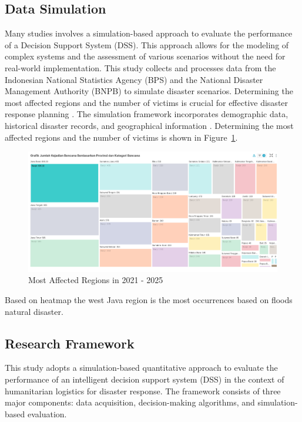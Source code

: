 \documentclass[journal,final,a4paper,twoside,11pt]{IEEEtran}
\begin{document}
\subsection{Data Simulation}

Many studies involves a simulation-based approach to evaluate the performance of a Decision Support System (DSS)\cite{he2020dynamic}. This approach allows for the modeling of complex systems and the assessment of various scenarios without the need for real-world implementation\cite{latchmore2023integrating}. This study collects and processes data from the Indonesian National Statistics Agency (BPS) and the National Disaster Management Authority (BNPB) to simulate disaster scenarios. Determining the most affected regions and the number of victims is crucial for effective disaster response planning \cite{endo2020estimating}. The simulation framework incorporates demographic data, historical disaster records, and geographical information \cite{santos2020workforce}. Determining the most affected regions and the number of victims is shown in Figure~\ref{fig:simulationframework}. 
\begin{figure}[htbp]
    \centerline{\includegraphics[width=0.8\linewidth]{fig4.png}
    }
    \caption{Most Affected Regions in 2021 - 2025}
    \label{fig:simulationframework}
\end{figure}

{}

Based on heatmap the west Java region is the most occurrences based on floods natural disaster.


\subsection{Research Framework}

This study adopts a simulation-based quantitative approach to evaluate the performance of an intelligent decision support system (DSS) in the context of humanitarian logistics for disaster response. The framework consists of three major components: data acquisition, decision-making algorithms, and simulation-based evaluation.
\end{document}

